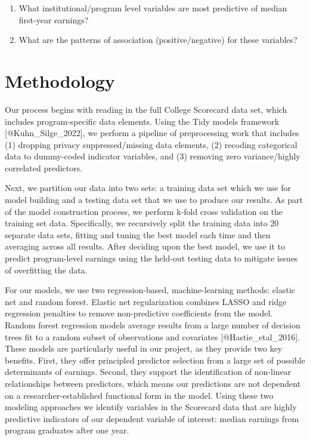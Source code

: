 \begin{enumerate}
\def\labelenumi{\arabic{enumi}.}
\tightlist
\item
  What institutional/program level variables are most predictive of
  median first-year earnings?
\item
  What are the patterns of association (positive/negative) for these
  variables?
\end{enumerate}

\hypertarget{methodology}{%
\section{Methodology}\label{methodology}}

Our process begins with reading in the full College Scorecard data set,
which includes program-specific data elements. Using the Tidy models
framework {[}@Kuhn\_Silge\_2022{]}, we perform a pipeline of
preprocessing work that includes (1) dropping privacy suppressed/missing
data elements, (2) recoding categorical data to dummy-coded indicator
variables, and (3) removing zero variance/highly correlated predictors.

Next, we partition our data into two sets: a training data set which we
use for model building and a testing data set that we use to produce our
results. As part of the model construction process, we perform k-fold
cross validation on the training set data. Specifically, we recursively
split the training data into 20 separate data sets, fitting and tuning
the best model each time and then averaging across all results. After
deciding upon the best model, we use it to predict program-level
earnings using the held-out testing data to mitigate issues of
overfitting the data.

For our models, we use two regression-based, machine-learning methods:
elastic net and random forest. Elastic net regularization combines LASSO
and ridge regression penalties to remove non-predictive coefficients
from the model. Random forest regression models average results from a
large number of decision trees fit to a random subset of observations
and covariates {[}@Hastie\_etal\_2016{]}. These models are particularly
useful in our project, as they provide two key benefits. First, they
offer principled predictor selection from a large set of possible
determinants of earnings. Second, they support the identification of
non-linear relationships between predictors, which means our predictions
are not dependent on a researcher-established functional form in the
model. Using these two modeling approaches we identify variables in the
Scorecard data that are highly predictive indicators of our dependent
variable of interest: median earnings from program graduates after one
year.

